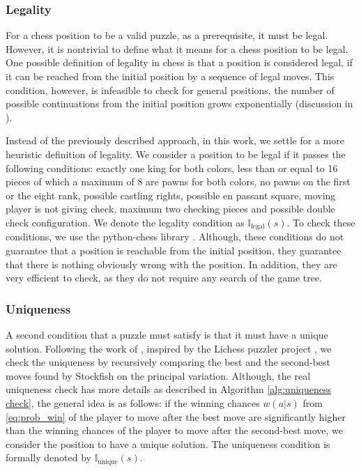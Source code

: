 \subsubsection{Legality}
\label{sec:legality}

For a chess position to be a valid puzzle, as a prerequisite, it must be legal. However, it is nontrivial to define what it means for a chess position to be legal. One possible definition of legality in chess is that a position is considered legal, if it can be reached from the initial position by a sequence of legal moves. This condition, however, is infeasible to check for general positions, the number of possible continuations from the initial position grows exponentially (discussion in \cite{howtodetectanillegalposition}).

Instead of the previously described approach, in this work, we settle for a more heuristic definition of legality. We consider a position to be legal if it passes the following conditions: exactly one king for both colors, less than or equal to 16 pieces of which a maximum of 8 are pawns for both colors, no pawns on the first or the eight rank, possible castling rights, possible en passant square, moving player is not giving check, maximum two checking pieces and possible double check configuration. We denote the legality condition as $\mathbb{I}_{\text{legal}}(s)$. To check these conditions, we use the python-chess library \cite{python-chess}. Although, these conditions do not guarantee that a position is reachable from the initial position, they guarantee that there is nothing obviously wrong with the position. In addition, they are very efficient to check, as they do not require any search of the game tree.

\subsubsection{Uniqueness}
\label{sec:uniqueness}

A second condition that a puzzle must satisfy is that it must have a unique solution. Following the work of \citeauthor{feng2025generatingcreativechesspuzzles}, inspired by the Lichess puzzler project \cite{lichesspuzzler}, we check the uniqueness by recursively comparing the best and the second-best moves found by Stockfish on the principal variation. Although, the real uniqueness check has more details as described in Algorithm \ref{alg:uniqueness check}, the general idea is as follows: if the winning chances $w(a | s)$ from \eqref{eq:prob_win} of the player to move after the best move are significantly higher than the winning chances of the player to move after the second-best move, we consider the position to have a unique solution. The uniqueness condition is formally denoted by $\mathbb{I}_{\text{unique}}(s)$.

